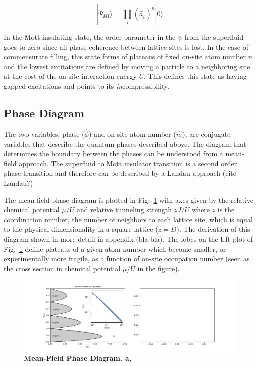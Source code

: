 \begin{equation}
\label{eqn:MI}
|\Psi_{MI}\rangle = \prod_i \left ( \hat{a}_i^\dagger \right )^n |0\rangle
\end{equation}

In the Mott-insulating state, the order parameter in the $\psi$ from the superfluid goes to zero since all phase coherence between lattice sites is lost. In the case of commensurate filling, this state forms of plateaus of fixed on-site atom number $n$ and the lowest excitations are defined by moving a particle to a neighboring site at the cost of the on-site interaction energy $U$. This defines this state as having gapped excitations and points to its \emph{in}compressibility.

\subsection{Phase Diagram}

The two variables, phase ($\hat{\phi}$) and on-site atom number ($\hat{n_i}$), are conjugate variables that describe the quantum phases described above. The diagram that determines the boundary between the phases can be understood from a mean-field approach. The superfluid to Mott insulator transition is a second order phase transition and therefore can be described by a Landau approach (cite Landau?)

The mean-field phase diagram is plotted in Fig.~\ref{fig:MF} with axes given by the relative chemical potential $\mu/U$ and relative tunneling strength $zJ/U$ where $z$ is the coordination number, the number of neighbors to each lattice site, which is equal to the physical dimensionality in a square lattice ($z=D$).  The derivation of this diagram shown in more detail in appendix (bla bla). The lobes on the left plot of Fig.~\ref{fig:MF} define plateaus of a given atom number which become smaller, or experimentally more fragile, as a function of on-site occupation number (seen as the cross section in chemical potential $\mu/U$ in the figure).

\begin{figure}[ht!]
		\includegraphics[width=\columnwidth]{figures/ch1/MeanFieldPhaseDiag/MeanFieldDiag.pdf} 
		\caption{\textbf{Mean-Field Phase Diagram. a,}  }
		\label{fig:MF}	
\end{figure}

